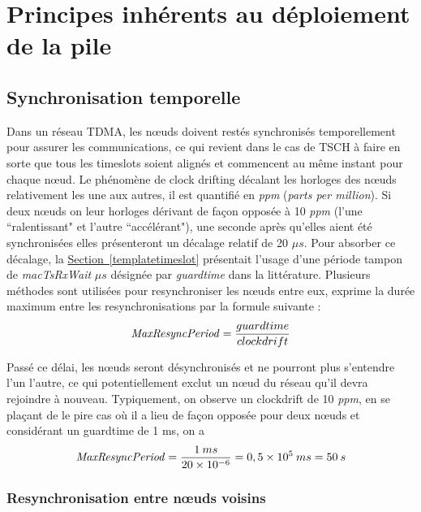 \documentclass[]{report}
\newcommand{\wordlink}[2]{\hyperref[#2]{#1~\ref{#2}}}
\begin{document}
\newpage

\section{Principes inhérents au déploiement de la pile}
	\subsection{Synchronisation temporelle}
	\label{synchrotemp}

	Dans un réseau TDMA, les nœuds doivent restés synchronisés temporellement pour assurer les communications, ce qui revient dans le cas de TSCH à faire en sorte que tous les timeslots soient alignés et commencent au même instant pour chaque nœud. Le phénomène de clock drifting décalant les horloges des nœuds relativement les une aux autres, il est quantifié en \textit{ppm} (\textit{parts per million}). Si deux nœuds on leur horloges dérivant de façon opposée à 10 \textit{ppm} (l'une ``ralentissant" et l'autre ``accélérant"), une seconde après qu'elles aient été synchronisées elles présenteront un décalage relatif de 20 $\mu s$. Pour absorber ce décalage, la \wordlink{Section}{templatetimeslot} présentait l'usage d'une période tampon de \textit{macTsRxWait} $\mu s$ désignée par \textit{guardtime} dans la littérature. Plusieurs méthodes sont utilisées pour resynchroniser les nœuds entre eux, \cite{openWSN} exprime la durée maximum entre les resynchronisations par la formule suivante :
\vspace{-0.2cm}
\begin{align}
\text{\textit{MaxResyncPeriod}} = \frac{guardtime}{clockdrift}
\end{align}

\par Passé ce délai, les nœuds seront désynchronisés et ne pourront plus s'entendre l'un l'autre, ce qui potentiellement exclut un nœud du réseau qu'il devra rejoindre à nouveau. Typiquement, on observe un clockdrift de 10 \textit{ppm}, en se plaçant de le pire cas où il a lieu de façon opposée pour deux nœuds et considérant un guardtime de 1 ms, on a
\vspace{-0.2cm}
\begin{align*}
\text{\textit{MaxResyncPeriod}} = \frac{1 \: ms}{20 \times 10^{-6}} = 0,5 \times 10^5 \: ms = 50 \: s
\end{align*}
 
\vspace{0.2cm}
\subsubsection{Resynchronisation entre nœuds voisins} 
 
\end{document}
